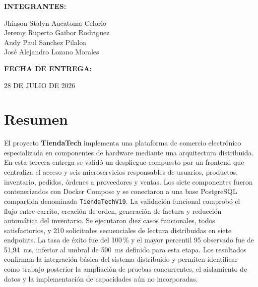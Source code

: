 \documentclass[12pt]{article}
\begin{document}
\begin{titlepage}
        {\large\textbf{INTEGRANTES:}\par}
        \vspace{0.25cm}
        {\normalsize
        Jhinson Stalyn Aucatoma Celorio \\
        Jeremy Ruperto Gaibor Rodriguez \\
        Andy Paul Sanchez Pilaloa \\
        José Alejandro Lozano Morales \par}
        \vspace{0.7cm}

        {\large\textbf{FECHA DE ENTREGA:}\par}
        \vspace{0.2cm}
        {\large 28 DE JULIO DE 2026 \par}
    \end{titlepage}

    \tableofcontents
    \newpage


    \section*{Resumen}

    El proyecto \textbf{TiendaTech} implementa una plataforma de comercio electrónico especializada en componentes de hardware mediante una arquitectura distribuida. En esta tercera entrega se validó un despliegue compuesto por un frontend que centraliza el acceso y seis microservicios responsables de usuarios, productos, inventario, pedidos, órdenes a proveedores y ventas. Los siete componentes fueron contenerizados con Docker Compose y se conectaron a una base PostgreSQL compartida denominada \texttt{TiendaTechV19}. La validación funcional comprobó el flujo entre carrito, creación de orden, generación de factura y reducción automática del inventario. Se ejecutaron diez casos funcionales, todos satisfactorios, y 210 solicitudes secuenciales de lectura distribuidas en siete endpoints. La tasa de éxito fue del 100\,\% y el mayor percentil 95 observado fue de 51,94~ms, inferior al umbral de 500~ms definido para esta etapa. Los resultados confirman la integración básica del sistema distribuido y permiten identificar como trabajo posterior la ampliación de pruebas concurrentes, el aislamiento de datos y la implementación de capacidades aún no incorporadas.

    \vspace{1cm}
\end{document}
